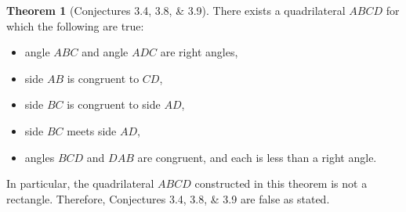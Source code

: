 \documentclass{tufte-handout}
\theoremstyle{definition}
\newtheorem{theorem}{Theorem}[section]
\begin{document}
\begin{theorem}[Conjectures 3.4, 3.8, \& 3.9]
There exists a quadrilateral $ABCD$ for which the following are true:
\begin{itemize}
\item angle $ABC$ and angle $ADC$ are right angles,
\item side $AB$ is congruent to $CD$,
\item side $BC$ is congruent to side $AD$,
\item side $BC$ meets side $AD$,
\item angles $BCD$ and $DAB$ are congruent, and each is less than a right angle.
\end{itemize}
\end{theorem}

In particular, the quadrilateral $ABCD$ constructed in this theorem is not a rectangle. Therefore, Conjectures 3.4, 3.8, \& 3.9 are false as stated.


\clearpage
\end{document}
